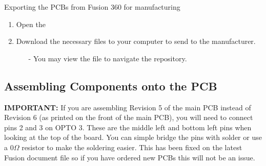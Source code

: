 \begin{subsubsec}{Exporting the PCBs from Fusion 360 for manufacturing}
\vspace{1em}
\begin{enumerate}
    \item Open the 
    \item Download the necessary files to your computer to send to the manufacturer.
    \begin{itemize}
        \item[-] You may view the   file to navigate the repository.
    \end{itemize}
\end{enumerate}




\end{subsubsec}













\subsection{Assembling Components onto the PCB}

\textbf{IMPORTANT: }If you are assembling Revision 5 of the main PCB instead of Revision 6 (as printed on the front of the main PCB), you will need to connect pins 2 and 3 on OPTO 3. These are the middle left and bottom left pins when looking at the top of the board. You can simple bridge the pins with solder or use a 0$\Omega$ resistor to make the soldering easier. This has been fixed on the latest Fusion document file so if you have ordered new PCBs this will not be an issue. 

